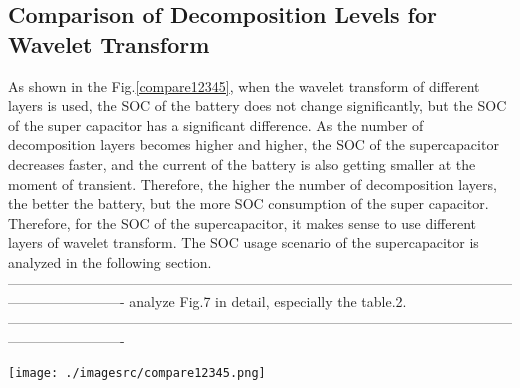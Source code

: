 \documentclass[energies,article,submit,moreauthors,pdftex,10pt,a4paper]{Definitions/mdpi}
\begin{document}
\subsection{Comparison of Decomposition Levels for Wavelet Transform }
As shown in the Fig.\ref{compare12345}, when the wavelet transform of different layers is used, the SOC of the battery does not change significantly, but the SOC of the super capacitor has a significant difference. As the number of decomposition layers becomes higher and higher, the SOC of the supercapacitor decreases faster, and the current of the battery is also getting smaller at the moment of transient. Therefore, the higher the number of decomposition layers, the better the battery, but the more SOC consumption of the super capacitor. Therefore, for the SOC of the supercapacitor, it makes sense to use different layers of wavelet transform. The SOC usage scenario of the supercapacitor is analyzed in the following section.
-------------------------------------------------------------------------------------------------------------------------------------
analyze Fig.7 in detail, especially the table.2.\\
-------------------------------------------------------------------------------------------------------------------------------------

\begin{figure*}[ht]
\centering
\texttt{[image: ./imagesrc/compare12345.png]}
\caption{The results of three driving cycle  HWFET, NYCC, UDDS under WT of different levels.}
\label{compare12345}
\end{figure*}
\end{document}
